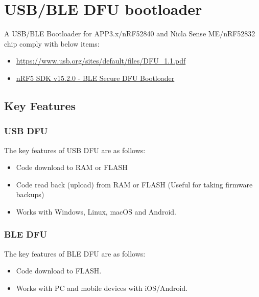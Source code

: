 \documentclass{article}
\begin{document}
\section{USB/BLE DFU bootloader}

A USB/BLE  Bootloader for APP3.x/nRF52840 and Nicla Sense ME/nRF52832 chip comply with below items:

\begin{itemize}
	\item \url{https://www.usb.org/sites/default/files/DFU_1.1.pdf}
	\item \href{https://infocenter.nordicsemi.com/index.jsp?topic=%2Fcom.nordic.infocenter.sdk5.v15.2.0%2Fble_sdk_app_dfu_bootloader.html&cp=9_5_3_4_1_3}{nRF5 SDK v15.2.0 - BLE Secure DFU Bootloader}
\end{itemize}

\subsection{Key Features}

\subsubsection{USB DFU}
The key features of USB DFU are as follows:
\begin{itemize}
	\item Code download to RAM or FLASH
	\item Code read back (upload) from  RAM or FLASH (Useful for taking firmware backups)
	\item Works with Windows, Linux, macOS and Android.
\end{itemize}

\subsubsection{BLE DFU}
The key features of BLE DFU are as follows:
\begin{itemize}
	\item Code download to FLASH.
	\item Works with PC and mobile devices with iOS/Android.
\end{itemize}
\end{document}
